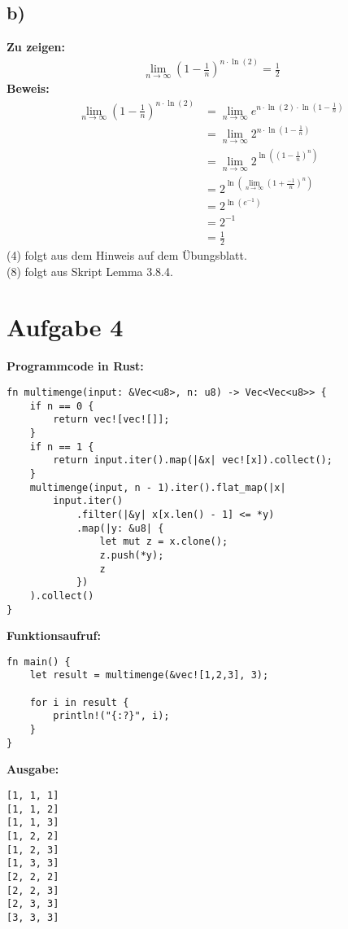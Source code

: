\documentclass[a4paper]{scrartcl}
\begin{document}
\subsection*{b)}
\textbf{Zu zeigen:} 
\begin{align*}
\lim_{n \to \infty} \left(1 - \frac{1}{n}\right)^{n \cdot \ln(2)} = \frac{1}{2}
\end{align*}
\textbf{Beweis:} \\
\begin{align}
\lim_{n \to \infty} \left(1 - \frac{1}{n}\right)^{n \cdot \ln(2)} &= \lim_{n \to \infty} e^{n \cdot \ln(2) \cdot  \ln(1-\frac{1}{n})} \\
&= \lim_{n \to \infty} 2^{n \cdot \ln(1-\frac{1}{n})} \\
&= \lim_{n \to \infty} 2^{\ln((1-\frac{1}{n})^n)} \\
&= 2^{\ln(\lim_{n \to \infty} (1+\frac{-1}{n})^n)} \\
&= 2^{\ln(e^{-1})} \\
&= 2^{-1} \\
&= \frac{1}{2}
\end{align}
(4) folgt aus dem Hinweis auf dem Übungsblatt. \\ 
(8) folgt aus Skript Lemma 3.8.4. 

\section*{Aufgabe 4}
\textbf{Programmcode in Rust:}
\begin{lstlisting}
fn multimenge(input: &Vec<u8>, n: u8) -> Vec<Vec<u8>> {
	if n == 0 {
		return vec![vec![]];
	}
	if n == 1 {
		return input.iter().map(|&x| vec![x]).collect();
	}
	multimenge(input, n - 1).iter().flat_map(|x| 
		input.iter()
			.filter(|&y| x[x.len() - 1] <= *y)
			.map(|y: &u8| {
				let mut z = x.clone();
				z.push(*y);
				z
			})
	).collect()
}
\end{lstlisting}
\newpage
\textbf{Funktionsaufruf:}
\begin{lstlisting}
fn main() {
	let result = multimenge(&vec![1,2,3], 3);

	for i in result {
		println!("{:?}", i);
	}
}
\end{lstlisting}
\textbf{Ausgabe:}
\begin{lstlisting}
[1, 1, 1]
[1, 1, 2]
[1, 1, 3]
[1, 2, 2]
[1, 2, 3]
[1, 3, 3]
[2, 2, 2]
[2, 2, 3]
[2, 3, 3]
[3, 3, 3]
\end{lstlisting}
\end{document}
